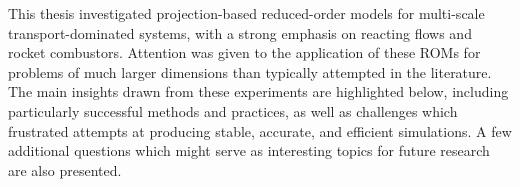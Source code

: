 This thesis investigated projection-based reduced-order models for  multi-scale transport-dominated systems, with a strong emphasis on reacting flows and rocket combustors. Attention was given to the application of these ROMs for problems of much larger dimensions than typically attempted in the literature. The main insights drawn from these experiments are highlighted below, including particularly successful methods and practices, as well as challenges which frustrated attempts at producing stable, accurate, and efficient simulations. A few additional questions which might serve as interesting topics for future research are also presented.